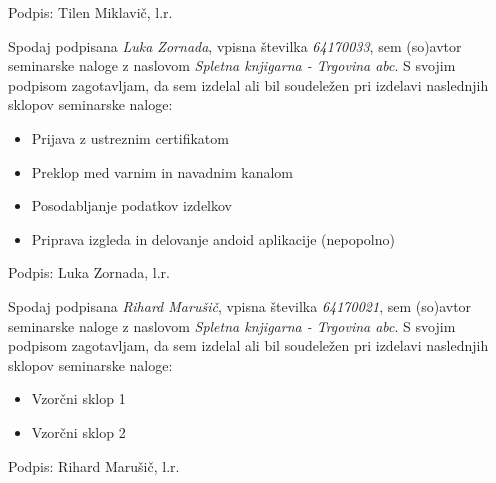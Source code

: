 \documentclass[a4paper,12pt]{report}
\newcommand{\naslov}     {Spletna knjigarna - Trgovina abc}
\newcommand{\prviavtor}  {Tilen Miklavič}
\newcommand{\drugiavtor} {Luka Zornada}
\newcommand{\drugiindeks}{64170033}
\newcommand{\tretjiavtor} {Rihard Marušič}
\newcommand{\tretjiindeks}{64170021}
\begin{document}
Podpis: {\prviavtor}, l.r.

\newpage

Spodaj podpisana \textit{\drugiavtor}, vpisna številka \textit{\drugiindeks}, sem (so)avtor seminarske naloge z naslovom \textit{\naslov}. S svojim podpisom zagotavljam, da sem izdelal ali bil soudeležen pri izdelavi naslednjih sklopov seminarske naloge:
\begin{itemize}
	\item Prijava z ustreznim certifikatom
        \item Preklop med varnim in navadnim kanalom
        \item Posodabljanje podatkov izdelkov
        \item Priprava izgleda in delovanje andoid aplikacije (nepopolno)
\end{itemize}

Podpis: {\drugiavtor}, l.r.

\newpage

Spodaj podpisana \textit{\tretjiavtor}, vpisna številka \textit{\tretjiindeks}, sem (so)avtor seminarske naloge z naslovom \textit{\naslov}. S svojim podpisom zagotavljam, da sem izdelal ali bil soudeležen pri izdelavi naslednjih sklopov seminarske naloge:
\begin{itemize}
    \item Vzorčni sklop 1
	 \item Vzorčni sklop 2
\end{itemize}

Podpis: {\tretjiavtor}, l.r.
\end{document}
